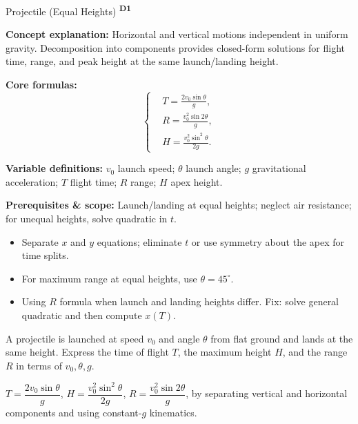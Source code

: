 ﻿\documentclass[12pt,a4paper]{article}
\providecommand{\KPFormulas}{}
\providecommand{\KPHeuristics}{}
\providecommand{\KPProblems}{}
\newcommand{\DOne}{\texorpdfstring{\textsuperscript{\textbf{D1}}}{ D1}}
\begin{document}
\begin{KnowledgePoint}{Projectile (Equal Heights) \DOne}
  \KPFormulas
  \begin{formulabox}
  \textbf{Concept explanation:} Horizontal and vertical motions independent in uniform gravity. Decomposition into components provides closed-form solutions for flight time, range, and peak height at the same launch/landing height.

  \textbf{Core formulas:}
  \[
  \left\{\begin{aligned}
    &T=\frac{2v_0\sin\theta}{g},\\
    &R=\frac{v_0^2\sin2\theta}{g},\\
    &H=\frac{v_0^2\sin^2\theta}{2g}.
  \end{aligned}\right.
  \]

  \textbf{Variable definitions:} $v_0$ launch speed; $\theta$ launch angle; $g$ gravitational acceleration; $T$ flight time; $R$ range; $H$ apex height.

  \textbf{Prerequisites \& scope:} Launch/landing at equal heights; neglect air resistance; for unequal heights, solve quadratic in $t$.
  \end{formulabox}

  \KPHeuristics
  \begin{heuristicsbox}
  \begin{itemize}[leftmargin=*]
    \item Separate $x$ and $y$ equations; eliminate $t$ or use symmetry about the apex for time splits.
    \item For maximum range at equal heights, use $\theta=45^\circ$.
  \end{itemize}
  \vspace{0.4em}
  \begin{itemize}[leftmargin=*]
    \item Using $R$ formula when launch and landing heights differ. Fix: solve general quadratic and then compute $x(T)$.
  \end{itemize}
  \end{heuristicsbox}

  \KPProblems
  \begin{cheatproblem}
  A projectile is launched at speed $v_0$ and angle $\theta$ from flat ground and lands at the same height. Express the time of flight $T$, the maximum height $H$, and the range $R$ in terms of $v_0,\theta,g$.
  \begin{solutionbox}
  $T=\dfrac{2v_0\sin\theta}{g}$, $H=\dfrac{v_0^2\sin^2\theta}{2g}$, $R=\dfrac{v_0^2\sin2\theta}{g}$, by separating vertical and horizontal components and using constant-$g$ kinematics.
  \end{solutionbox}
  \end{cheatproblem}


\end{KnowledgePoint}
\end{document}
